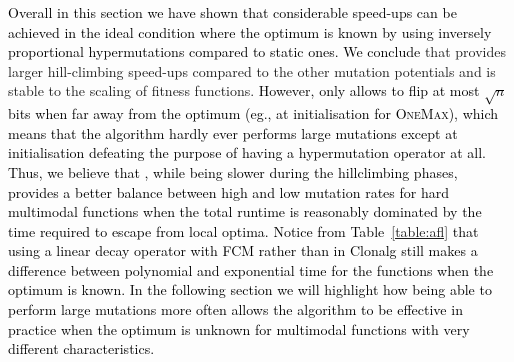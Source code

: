 \documentclass[lettersize,journal]{IEEEtran}
\newcommand{\new}[1]{\textcolor{black}{#1}}
\begin{document}






\new{Overall in this section we have shown that considerable speed-ups can be achieved in the ideal condition where the optimum is known by using inversely proportional hypermutations compared to static ones.
We conclude} that {\expoHD } provides larger hill-climbing speed-ups compared to the other mutation potentials and is stable to the scaling of fitness functions.
\new{However, {\expoHD } only allows to flip at most $\sqrt{n}$ bits when far away from the optimum (eg., at initialisation for \textsc{OneMax}), which means that the algorithm hardly ever performs large mutations except at initialisation defeating the purpose of having a hypermutation operator at all. Thus, we believe that \linHD, while being slower during the hillclimbing phases, provides a better balance between high and low mutation rates for hard multimodal functions when the total runtime is reasonably dominated by the time required to escape from local optima. Notice from Table~\ref{table:afl} that using a linear decay operator with FCM  rather than in Clonalg still makes a difference between polynomial and exponential time for the functions when the optimum is known. In the following section we will highlight how being able to perform large mutations more often allows the algorithm to be effective in practice when the optimum is unknown for multimodal functions with very different characteristics.}
\end{document}
